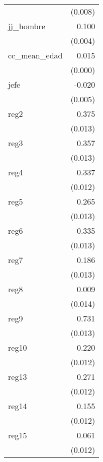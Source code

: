 {\begin{longtable}{l*{1}{D{.}{.}{-1}}}
            &     (0.008)         \\
\addlinespace
jj\_hombre   &       0.100\sym{***}\\
            &     (0.004)         \\
\addlinespace
cc\_mean\_edad&       0.015\sym{***}\\
            &     (0.000)         \\
\addlinespace
jefe        &      -0.020\sym{***}\\
            &     (0.005)         \\
\addlinespace
reg2        &       0.375\sym{***}\\
            &     (0.013)         \\
\addlinespace
reg3        &       0.357\sym{***}\\
            &     (0.013)         \\
\addlinespace
reg4        &       0.337\sym{***}\\
            &     (0.012)         \\
\addlinespace
reg5        &       0.265\sym{***}\\
            &     (0.013)         \\
\addlinespace
reg6        &       0.335\sym{***}\\
            &     (0.013)         \\
\addlinespace
reg7        &       0.186\sym{***}\\
            &     (0.013)         \\
\addlinespace
reg8        &       0.009         \\
            &     (0.014)         \\
\addlinespace
reg9        &       0.731\sym{***}\\
            &     (0.013)         \\
\addlinespace
reg10       &       0.220\sym{***}\\
            &     (0.012)         \\
\addlinespace
reg13       &       0.271\sym{***}\\
            &     (0.012)         \\
\addlinespace
reg14       &       0.155\sym{***}\\
            &     (0.012)         \\
\addlinespace
reg15       &       0.061\sym{***}\\
            &     (0.012)         \\

\end{longtable}}
